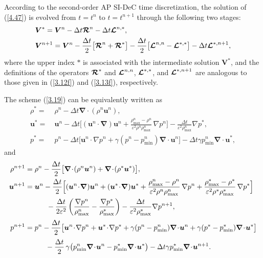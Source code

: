 \documentclass[preprint,12pt]{elsarticle}
\def\bnabla{\bm{\nabla}}
\newcommand{\dt}{\Delta t}
\newcommand{\ve}{\varepsilon}
\newcommand\eref[1]{(\ref{#1})}
\begin{document}
According to the second-order AP SI-DeC time discretization, the solution of \eref{4.47} is evolved from $t=t^n$ to $t=t^{n+1}$ through the
following two stages:
\begin{equation}
	\begin{aligned}
		&\bm V^*=\bm V^n-\dt\bm{{\cal R}}^n-\dt\bm{{\cal L}}^{n,*},\\
		&\bm V^{n+1}=\bm V^n-\frac{\dt}{2}\big[\bm{{\cal R}}^n+\bm{{\cal R}}^*\big]-\frac{\dt}{2}\big[\bm{{\cal L}}^{n,n}-\bm{{\cal L}}^{*,*}\big]
		-\dt\bm{{\cal L}}^{*,n+1},
	\end{aligned}
	\label{3.19}
\end{equation}
where the upper index $*$ is associated with the intermediate solution $\bm V^*$, and the definitions of the operators $\bm{{\cal R}}^*$ and
$\bm{{\cal L}}^{n,n}$, $\bm{{\cal L}}^{*,*}$, and $\bm{{\cal L}}^{*,n+1}$ are analogous to those given in \eref{3.12f} and \eref{3.13f},
respectively.

The scheme \eref{3.19} can be equivalently written as
\begin{equation}
	\begin{aligned}
		\rho^*=&~\rho^n-\dt\bnabla\!\cdot\!(\rho^n\bm u^n),\\
		\bm u^*=&~\bm u^n-\dt\Big[(\bm u^n\!\cdot\!\bnabla)\bm u^n+\frac{\rho_{\max}^n-\rho^n}{\ve^2\rho^n\rho_{\max}^n}\,\nabla p^n\Big]-
		\frac{\dt}{\ve^2\rho_{\max}^n}\nabla p^*,\\
		p^*=&~p^n-\dt\big[\bm u^n\!\cdot\!\nabla p^n+\gamma(p^n-p_{\min}^n)\bnabla\!\cdot\!\bm u^n\big]-\dt\gamma p_{\min}^n\bnabla\!\cdot\!\bm u^*,
	\end{aligned}
	\label{3.20}
\end{equation}
and
\begin{equation}
	\begin{aligned}
		\rho^{n+1}&=\rho^n-\frac{\dt}{2}\big[\bnabla\!\cdot\!(\rho^n\bm u^n)+\bnabla\!\cdot\!(\rho^*\bm u^*)\big],\\
		\bm u^{n+1}&=\bm u^n-\frac{\dt}{2}\Big[(\bm u^n\!\cdot\!\bnabla)\bm u^n+(\bm u^*\!\cdot\!\bnabla)\bm u^*
		+\frac{\rho_{\max}^n-\rho^n}{\ve^2\rho^n\rho_{\max}^n}\,\nabla p^n+\frac{\rho_{\max}^*-\rho^*}{\ve^2\rho^*\rho_{\max}^*}\,\nabla p^*\Big]\\
		&\hspace*{1.05cm}-\frac{\dt}{2\ve^2}\left(\frac{\nabla p^n}{\rho^n_{\max}}-\frac{\nabla p^*}{\rho^*_{\max}}\right)-
		\frac{\dt}{\ve^2\rho_{\max}^*}\nabla p^{n+1},\\[0.5ex]
		p^{n+1}&=p^n-\frac{\dt}{2}\big[\bm u^n\!\cdot\!\nabla p^n+\bm u^*\!\cdot\!\nabla p^*+\gamma(p^n-p_{\min}^n)\bnabla\!\cdot\!\bm u^n
		+\gamma(p^*-p_{\min}^*)\bnabla\!\cdot\!\bm u^*\big]\\[0.5ex]
		&\hspace*{1.0cm}-\frac{\dt}{2}\,\gamma\big(p_{\min}^n\bnabla\!\cdot\!\bm u^n-p_{\min}^*\bnabla\!\cdot\!\bm u^*\big)
		-\dt\gamma p_{\min}^*\bnabla\!\cdot\!\bm u^{n+1}.
	\end{aligned}
	\label{3.21}
\end{equation}
\end{document}
